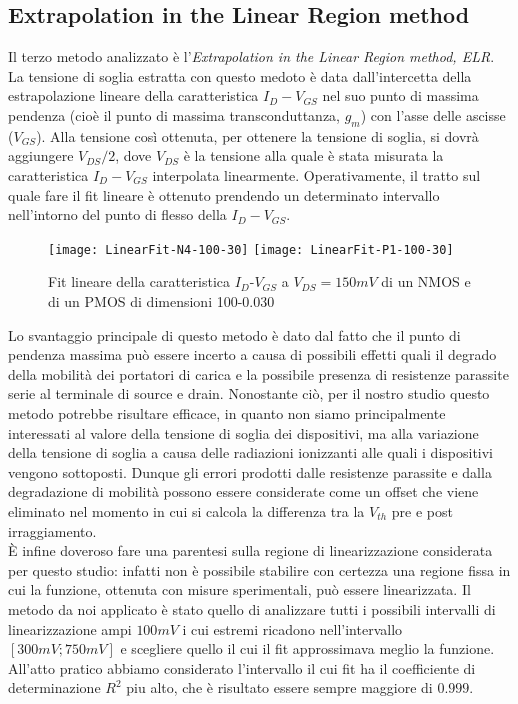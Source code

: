 \subsection{Extrapolation in the Linear Region method}
Il terzo metodo analizzato è l'\emph{Extrapolation in the Linear Region method, ELR}\cite{art2}. La tensione di soglia estratta con questo medoto è data dall'intercetta della estrapolazione lineare della caratteristica $I_D-V_{GS}$ nel suo punto di massima pendenza (cioè il punto di massima transconduttanza, $g_m$) con l'asse delle ascisse ($V_{GS}$). Alla tensione così ottenuta, per ottenere la tensione di soglia, si dovrà aggiungere $V_{DS}/2$, dove $V_{DS}$ è la tensione alla quale è stata misurata la caratteristica $I_D-V_{GS}$ interpolata linearmente. 
Operativamente, il tratto sul quale fare il fit lineare è ottenuto prendendo un determinato intervallo nell'intorno del punto di flesso della $I_D-V_{GS}$.

\begin{figure}[h!]
  \centering
  \texttt{[image: LinearFit-N4-100-30]}
  \texttt{[image: LinearFit-P1-100-30]}
  \caption{Fit lineare della caratteristica  $I_D$-$V_{GS}$ a $V_{DS}=150mV$ di un NMOS e di un PMOS di dimensioni 100-0.030 }
\end{figure}

Lo svantaggio principale di questo metodo è dato dal fatto che il punto di pendenza massima può essere incerto a causa di possibili effetti quali il degrado della mobilità dei portatori di carica e la possibile presenza di resistenze parassite serie al terminale di source e drain. 
Nonostante ciò, per il nostro studio questo metodo potrebbe risultare efficace, in quanto non siamo principalmente interessati al valore della tensione di soglia dei dispositivi, ma alla variazione della tensione di soglia a causa delle radiazioni ionizzanti alle quali i dispositivi vengono sottoposti. Dunque gli errori prodotti dalle resistenze parassite e dalla degradazione di mobilità possono essere considerate come un offset che viene eliminato nel momento in cui si calcola la differenza tra la $V_{th}$ pre e post irraggiamento.\\
È infine doveroso fare una parentesi sulla regione di linearizzazione considerata per questo studio: infatti non è possibile stabilire con certezza una regione fissa in cui la funzione, ottenuta con misure sperimentali, può essere linearizzata. Il metodo da noi applicato è stato quello di analizzare tutti i possibili intervalli di linearizzazione ampi $100 mV$ i cui estremi ricadono nell'intervallo $[300 mV ; 750mV]$ e scegliere quello il cui il fit approssimava meglio la funzione. All'atto pratico abbiamo considerato l'intervallo il cui fit ha il coefficiente di determinazione $R^2$ piu alto, che è risultato essere sempre maggiore di $0.999$.

